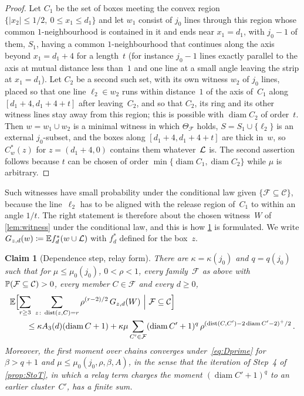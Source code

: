 \documentclass[11pt,letterpaper]{article}
\DeclareMathOperator{\diam}{diam}
\DeclareMathOperator{\dist}{dist}
\newtheorem{claim}{Claim}
\newenvironment{boxedclaim}[2]{\renewcommand{\theclaim}{#1}\begin{framed}\begin{claim}[#2]}{\end{claim}\end{framed}}
\begin{document}
\begin{proof}
Let $C_1$ be the set of boxes meeting the convex region $\{\lvert x_2\rvert\le1/2,\ 0\le x_1\le d_1\}$ and let $w_1$ consist of $j_0$ lines through this region whose common $1$-neighbourhood is contained in it and ends near $x_1=d_1$, with $j_0-1$ of them, $S_1$, having a common $1$-neighbourhood that continues along the axis beyond $x_1=d_1+4$ for a length~$t$ (for instance $j_0-1$ lines exactly parallel to the axis at mutual distance less than~$1$ and one line at a small angle leaving the strip at $x_1=d_1$). Let $C_2$ be a second such set, with its own witness $w_2$ of $j_0$ lines, placed so that one line $\ell_2\in w_2$ runs within distance~$1$ of the axis of~$C_1$ along $[d_1+4,d_1+4+t]$ after leaving~$C_2$, and so that $C_2$, its ring and its other witness lines stay away from this region; this is possible with $\diam C_2$ of order~$t$. Then $w=w_1\cup w_2$ is a minimal witness in which $\Theta_{\mathcal F}$ holds, $S=S_1\cup\{\ell_2\}$ is an external $j_0$-subset, and the boxes along $[d_1+4,d_1+4+t]$ are thick in~$w$, so $C^*_w(z)$ for $z=(d_1+4,0)$ contains them whatever~$\cL$ is. The second assertion follows because $t$ can be chosen of order $\min\{\diam C_1,\diam C_2\}$ while $\mu$ is arbitrary.
\end{proof}

Such witnesses have small probability under the conditional law given $\{\mathcal F\subseteq\mathcal C\}$, because the line~$\ell_2$ has to be aligned with the release region of~$C_1$ to within an angle $1/t$. The right statement is therefore about the chosen witness~$W$ of \cref{lem:witness} under the conditional law, and this is how \cref{claim:D} is formulated. We write $G_{z,d}(w)\coloneqq\E f^*_d(w\cup\cL)$ with $f^*_d$ defined for the box~$z$.

\begin{boxedclaim}{D}{Dependence step, relay form}
\label{claim:D}
There are $\kappa=\kappa(j_0)$ and $q=q(j_0)$ such that for $\mu\le\mu_0(j_0)$, $0<\rho<1$, every family~$\mathcal F$ as above with $\P(\mathcal F\subseteq\mathcal C)>0$, every member $C\in\mathcal F$ and every $d\ge0$,
\begin{equation}
\label{eq:Dprime}
\begin{aligned}
  &\E\Bigl[\sum_{r\ge3}\ \sum_{z\colon\dist(z,C)=r}\rho^{(r-2)/2}\,G_{z,d}(W)\ \Big\vert\ \mathcal F\subseteq\mathcal C\Bigr]\\
  &\qquad\le\kappa A_3(d)(\diam C+1)+\kappa\mu\sum_{C'\in\mathcal F}(\diam C'+1)^{q}\,\rho^{(\dist(C,C')-2\diam C'-2)^+/2}\,.
\end{aligned}
\end{equation}
Moreover, the first moment over chains converges under~\eqref{eq:Dprime} for $\beta>q+1$ and $\mu\le\mu_0(j_0,\rho,\beta,A)$, in the sense that the iteration of Step~4 of \cref{prop:StoT}, in which a relay term charges the moment $(\diam C'+1)^{q}$ to an earlier cluster~$C'$, has a finite sum.
\end{boxedclaim}
\end{document}
